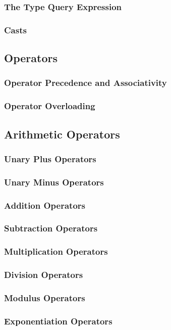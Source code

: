 \documentclass[10pt,twoside,titlepage]{article}
\begin{document}
\subsubsection{The Type Query Expression}
\subsubsection{Casts}
\subsection{Operators}
\subsubsection{Operator Precedence and Associativity}
\subsubsection{Operator Overloading}
\subsection{Arithmetic Operators}
\subsubsection{Unary Plus Operators}
\subsubsection{Unary Minus Operators}
\subsubsection{Addition Operators}
\subsubsection{Subtraction Operators}
\subsubsection{Multiplication Operators}
\subsubsection{Division Operators}
\subsubsection{Modulus Operators}
\subsubsection{Exponentiation Operators}
\end{document}

